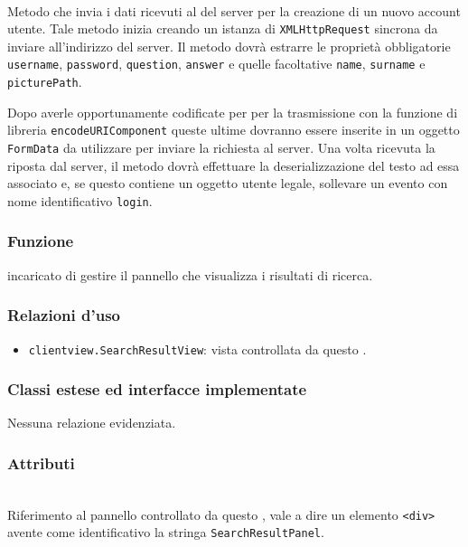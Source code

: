 \begin{description}
	\item{}\\
	Metodo che invia i dati ricevuti al  del server per la creazione di un nuovo account utente. Tale metodo inizia creando un istanza di \texttt{XMLHttpRequest} sincrona da inviare all'indirizzo del server. Il metodo dovrà estrarre le proprietà obbligatorie \verb'username', \verb'password', \verb'question', \verb'answer' e quelle facoltative \verb'name', \verb'surname' e \verb'picturePath'.
	
	Dopo averle opportunamente codificate per per la trasmissione con la funzione di libreria \verb'encodeURIComponent' queste ultime dovranno essere inserite in un oggetto \verb'FormData' da utilizzare per inviare la richiesta al server. Una volta ricevuta la riposta dal server, il metodo dovrà effettuare la deserializzazione del testo ad essa associato e, se questo contiene un oggetto utente legale, sollevare un evento con nome identificativo \verb'login'.

\end{description}



\subsubsection*{Funzione}
 incaricato di gestire il pannello che visualizza i risultati di ricerca.

\subsubsection*{Relazioni d'uso}
\begin{itemize}
  \item \texttt{clientview.SearchResultView}: vista controllata da questo .
\end{itemize}

\subsubsection*{Classi estese ed interfacce implementate}
Nessuna relazione evidenziata.

\subsubsection*{Attributi}
\begin{description}
\item{}\\
Riferimento al pannello controllato da questo , vale a dire un elemento \verb'<div>' avente come identificativo la stringa \verb'SearchResultPanel'.
\end{description}

